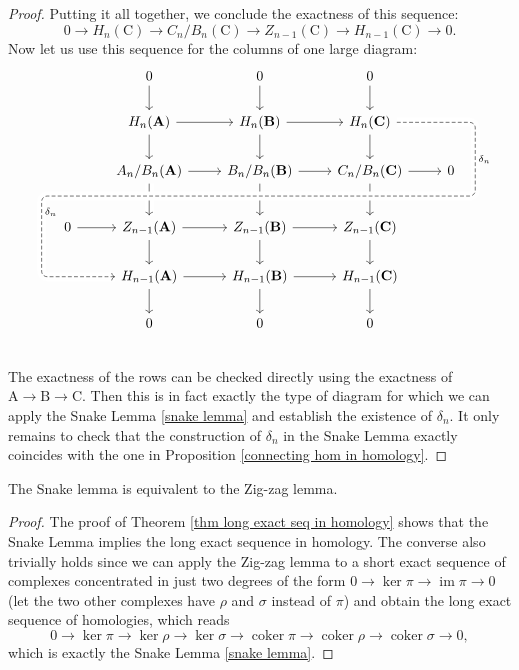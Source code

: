 \documentclass[english,letterpaper]{article}%
\numberwithin{equation}{section}
\numberwithin{figure}{section}
\numberwithin{table}{section}
\theoremstyle{definition}
\theoremstyle{definition}
\theoremstyle{definition}
\theoremstyle{plain}
\theoremstyle{plain}
\theoremstyle{plain}
\theoremstyle{plain}
\theoremstyle{remark}
\theoremstyle{remark}
\newcommand{\bm}[1]{\boldsymbol{\mathrm{#1}}}
\DeclareMathOperator{\im}{im}
\DeclareMathOperator{\coker}{coker}
\begin{document}
\begin{proof}
    Putting it all together, we conclude the exactness of this sequence:
    \[0\to H_n(\bm{C})\to C_n/B_n(\bm{C})\to Z_{n-1}(\bm{C})\to H_{n-1}(\bm{C})\to 0.\]
    Now let us use this sequence for the columns of one large diagram:
    \[\begin{tikzcd}
        && 0\ar{d}& 0\ar{d} &0\ar{d} &&\\
        & & H_n(\bm{A}) \ar{r} \ar{d} & H_n(\bm{B})\ar{r} \ar{d} &  H_n(\bm{C}) \ar{d}   %
        & & \\
        &  &  A_n/B_n(\bm{A}) \ar{r} & B_n/B_n(\bm{B}) \ar{r} \ar{dd} &  C_n/B_n(\bm{C})\ar{r}\ar{dd} & 0 &  ~\\[-10pt]
        & & &  ~ & & \ar[r, phantom, ""{coordinate, name=Y}] & ~\\[-10pt]
        ~&  \ar[l, phantom, ""{coordinate, name=Z}] 0 \ar{r} &  Z_{n-1}(\bm{A}) \ar[uu,leftarrow,crossing over]\ar{r} \ar{d} &  Z_{n-1}(\bm{B}) \ar{r} \ar{d} &  Z_{n-1}(\bm{C}) \ar{d} & &  \\
              & &  \ar[from=uuuurr, "\delta_n", dashed,crossing over, rounded corners,
                      to path=
                              { -- ([xshift=2ex]\tikztostart.east)
                              -| (Y) [near end]\tikztonodes
                              -| (Z) [near end]\tikztonodes
                              |- ([xshift=-2ex]\tikztotarget.west)
                               -- (\tikztotarget)}
                    ] H_{n-1}(\bm{A})\ar{r}\ar{d}
               &  H_{n-1}(\bm{B}) \ar{r}\ar{d}
               &  H_{n-1}(\bm{C})\ar{d}
               & 
               & \\
        && 0& 0 &0 &&\\
    \end{tikzcd}\]
    The exactness of the rows can be checked directly using the exactness of $\bm{A}\to \bm{B}\to\bm{C}$. Then this is in fact exactly the type of diagram for which we can apply the Snake Lemma \ref{snake lemma} and establish the existence of $\delta_n$. It only remains to check that the construction of $\delta_n$ in the Snake Lemma exactly coincides with the one in Proposition \ref{connecting hom in homology}.
\end{proof}
\begin{cor}
    The Snake lemma is equivalent to the Zig-zag lemma.
\end{cor}
\begin{proof}
     The proof of Theorem \ref{thm long exact seq in homology} shows that the Snake Lemma implies the long exact sequence in homology. The converse also trivially holds since we can apply the Zig-zag lemma to a short exact sequence of complexes concentrated in just two degrees of the form $0\to \ker\pi \to \im\pi \to 0$ (let the two other complexes have $\rho $ and $\sigma$ instead of $\pi$) and obtain the long exact sequence of homologies, which reads
    \[0\to \ker\pi \to \ker\rho\to \ker\sigma\to \coker\pi\to \coker\rho\to\coker\sigma\to 0, \]
    which is exactly the Snake Lemma \ref{snake lemma}.
\end{proof}
\end{document}
